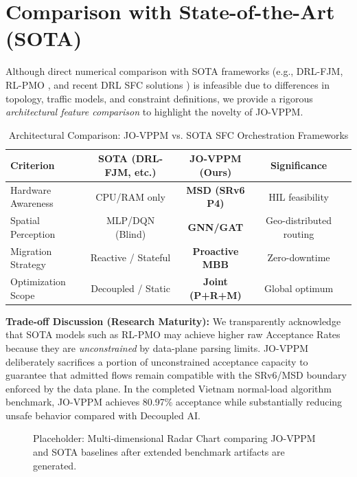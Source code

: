 \documentclass[12pt, a4paper, reqno, oneside]{book}
\begin{document}
\section{Comparison with State-of-the-Art (SOTA)}
\label{sec:sota_comparison}

Although direct numerical comparison with SOTA frameworks (e.g., DRL-FJM, RL-PMO \cite{hu2026rlpmo}, and recent DRL SFC solutions \cite{taktak2024drl}) is infeasible due to differences in topology, traffic models, and constraint definitions, we provide a rigorous \textit{architectural feature comparison} to highlight the novelty of JO-VPPM.

\begin{table}[H]
\centering
\caption{Architectural Comparison: JO-VPPM vs. SOTA SFC Orchestration Frameworks}
\label{table:sota_arch}
\small
\begin{tabular}{lcccc}
\toprule
\textbf{Criterion} & \textbf{SOTA (DRL-FJM, etc.)} & \textbf{JO-VPPM (Ours)} & \textbf{Significance} \\
\midrule
Hardware Awareness & CPU/RAM only & \textbf{MSD (SRv6 P4)} & HIL feasibility \\
Spatial Perception & MLP/DQN (Blind) & \textbf{GNN/GAT} & Geo-distributed routing \\
Migration Strategy & Reactive / Stateful & \textbf{Proactive MBB} & Zero-downtime \\
Optimization Scope & Decoupled / Static & \textbf{Joint (P+R+M)} & Global optimum \\
\bottomrule
\end{tabular}
\end{table}

\textbf{Trade-off Discussion (Research Maturity):} We transparently acknowledge that SOTA models such as RL-PMO may achieve higher raw Acceptance Rates because they are \textit{unconstrained} by data-plane parsing limits. JO-VPPM deliberately sacrifices a portion of unconstrained acceptance capacity to guarantee that admitted flows remain compatible with the SRv6/MSD boundary enforced by the data plane. In the completed Vietnam normal-load algorithm benchmark, JO-VPPM achieves 80.97\% acceptance while substantially reducing unsafe behavior compared with Decoupled AI.

\begin{figure}[H]
    \centering
    \vspace{6cm}
    \caption{Placeholder: Multi-dimensional Radar Chart comparing JO-VPPM and SOTA baselines after extended benchmark artifacts are generated.}
    \label{fig:radar_sota}
\end{figure}
\end{document}
